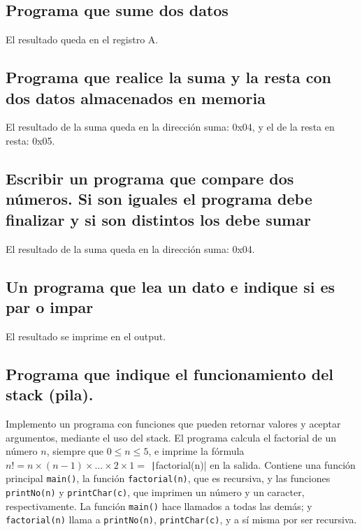 \documentclass{article}
\begin{document}


\setcounter{section}{1}
\subsection{Programa que sume dos datos}
El resultado queda en el registro A.

\subsection{Programa que realice la suma y la resta con dos datos almacenados en memoria}
El resultado de la suma queda en la dirección suma: 0x04, y el de la resta en resta: 0x05.

\subsection{Escribir un programa que compare dos números. Si son iguales el programa debe finalizar y si son distintos los debe sumar}
El resultado de la suma queda en la dirección suma: 0x04.

\subsection{Un programa que lea un dato e indique si es par o impar}
El resultado se imprime en el output.

\subsection{Programa que indique el funcionamiento del stack (pila).}
Implemento un programa con funciones que pueden retornar valores y aceptar argumentos, mediante el uso del stack. El programa calcula el factorial de un número $n$, siempre que $0\leq n\leq 5$, e imprime la fórmula $n! = n \times (n-1) \times \dots \times 2 \times 1 =$ \texttt|factorial(n)| en la salida. Contiene una función principal \texttt{main()}, la función \texttt{factorial(n)}, que es recursiva, y las funciones \texttt{printNo(n)} y \texttt{printChar(c)}, que imprimen un número y un caracter, respectivamente. La función \texttt{main()} hace llamados a todas las demás; y \texttt{factorial(n)} llama a \texttt{printNo(n)}, \texttt{printChar(c)}, y a sí misma por ser recursiva.
\end{document}
